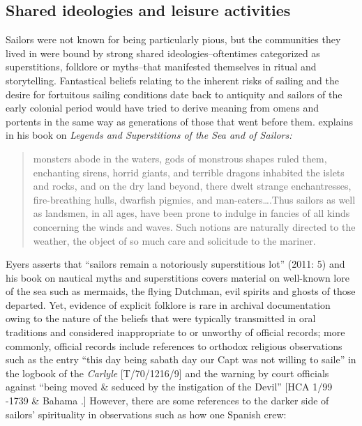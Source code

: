 \subsection{{Shared} {ideologies} {and} {leisure} {activities}}%

  Sailors were not known for being particularly pious, but the communities they lived in were bound by strong shared ideologies--oftentimes categorized as superstitions, folklore or myths--that manifested themselves in ritual and storytelling. Fantastical beliefs relating to the inherent risks of sailing and the desire for fortuitous sailing conditions date back to antiquity and sailors of the early colonial period would have tried to derive meaning from omens and portents in the same way as generations of those that went before them. \citet{Bassett1885} explains in his book on \textit{Legends and Superstitions of the Sea and of Sailors:}

\begin{quotation}
monsters abode in the waters, gods of monstrous shapes ruled them, enchanting sirens, horrid giants, and terrible dragons inhabited the islets and rocks, and on the dry land beyond, there dwelt strange enchantresses, fire-breathing hulls, dwarfish pigmies, and man-eaters….Thus sailors as well as landsmen, in all ages, have been prone to indulge in fancies of all kinds concerning the winds and waves. Such notions are naturally directed to the weather, the object of so much care and solicitude to the mariner. \citep[12]{Bassett1885}\end{quotation}

Eyers asserts that “sailors remain a notoriously superstitious lot” (2011: 5) and his book on nautical myths and superstitions covers material on well-known lore of the sea such as mermaids, the flying Dutchman, evil spirits and ghosts of those departed. Yet, evidence of explicit folklore is rare in archival documentation owing to the nature of the beliefs that were typically transmitted in oral traditions and considered inappropriate to or unworthy of official records; more commonly, official records include references to orthodox religious observations such as the entry “this day being sabath day our Capt was not willing to saile” in the logbook of the \textit{Carlyle} [T/70/1216/9] and the warning by court officials against “being moved \& seduced by the instigation of the Devil” [HCA 1/99 \citealt{Jamaica1738}-1739 \& Bahama \citealt{Islands1722}.] However, there are some references to the darker side of sailors’ spirituality in observations such as how one Spanish crew: 

